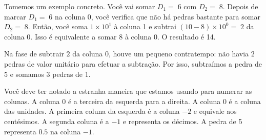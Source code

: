 \documentclass[12pt]{book}
\begin{document}
Tomemos um exemplo concreto. Você vai somar $D_1=\;6$
com $D_2=\;8$. Depois de marcar
$D_1=\;6$ na coluna 0, você verifica que
não há pedras bastante
para somar $D_2=\;8$. Então, você soma $1\times 10^{1}$ à coluna 1
e subtrai $(10-8)\times 10^0=\;2$ da coluna 0. Isso é equivalente
a somar $8$ à coluna 0. O resultado é 14.

\vspace{0.5cm}
\begin{minipage}{0.4\textwidth}
\end{minipage}%
%
\begin{minipage}{0.5\textwidth}
\end{minipage}

\vspace{0.5cm}
Na fase de subtrair $2$ da 
coluna 0, houve um pequeno contratempo:
não havia $2$ pedras de
valor unitário para efetuar a subtração.
Por isso, subtraímos a pedra de 5
e somamos 3 pedras de 1. 

Você deve ter notado a estranha maneira
que estamos usando para numerar as colunas.
A coluna 0 é a terceira da esquerda para
a direita. A coluna 0 é a coluna das
unidades. A primeira coluna da esquerda
é a coluna $-2$ e equivale aos centésimos.
A segunda coluna é a $-1$ e representa
os décimos. A pedra de 5 representa $0.5$
na coluna $-1$.
\end{document}
